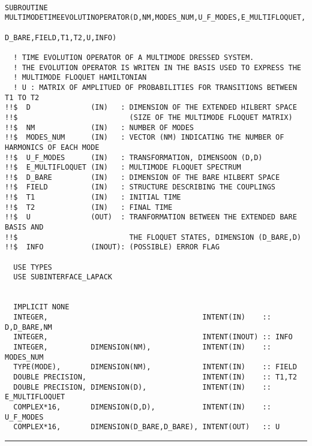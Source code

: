 \documentclass[10pt,a4paper]{article}
\begin{document}
\begin{verbatim}

SUBROUTINE MULTIMODETIMEEVOLUTINOPERATOR(D,NM,MODES_NUM,U_F_MODES,E_MULTIFLOQUET,
                                                D_BARE,FIELD,T1,T2,U,INFO) 

  ! TIME EVOLUTION OPERATOR OF A MULTIMODE DRESSED SYSTEM. 
  ! THE EVOLUTION OPERATOR IS WRITEN IN THE BASIS USED TO EXPRESS THE 
  ! MULTIMODE FLOQUET HAMILTONIAN
  ! U : MATRIX OF AMPLITUED OF PROBABILITIES FOR TRANSITIONS BETWEEN T1 TO T2
!!$  D              (IN)   : DIMENSION OF THE EXTENDED HILBERT SPACE 
!!$                          (SIZE OF THE MULTIMODE FLOQUET MATRIX)
!!$  NM             (IN)   : NUMBER OF MODES            
!!$  MODES_NUM      (IN)   : VECTOR (NM) INDICATING THE NUMBER OF HARMONICS OF EACH MODE
!!$  U_F_MODES      (IN)   : TRANSFORMATION, DIMENSOON (D,D) 
!!$  E_MULTIFLOQUET (IN)   : MULTIMODE FLOQUET SPECTRUM
!!$  D_BARE         (IN)   : DIMENSION OF THE BARE HILBERT SPACE
!!$  FIELD          (IN)   : STRUCTURE DESCRIBING THE COUPLINGS
!!$  T1             (IN)   : INITIAL TIME
!!$  T2             (IN)   : FINAL TIME
!!$  U              (OUT)  : TRANFORMATION BETWEEN THE EXTENDED BARE BASIS AND 
!!$                          THE FLOQUET STATES, DIMENSION (D_BARE,D)
!!$  INFO           (INOUT): (POSSIBLE) ERROR FLAG

  USE TYPES
  USE SUBINTERFACE_LAPACK


  IMPLICIT NONE
  INTEGER,                                    INTENT(IN)    :: D,D_BARE,NM 
  INTEGER,                                    INTENT(INOUT) :: INFO
  INTEGER,          DIMENSION(NM),            INTENT(IN)    :: MODES_NUM
  TYPE(MODE),       DIMENSION(NM),            INTENT(IN)    :: FIELD  
  DOUBLE PRECISION,                           INTENT(IN)    :: T1,T2  
  DOUBLE PRECISION, DIMENSION(D),             INTENT(IN)    :: E_MULTIFLOQUET 
  COMPLEX*16,       DIMENSION(D,D),           INTENT(IN)    :: U_F_MODES   
  COMPLEX*16,       DIMENSION(D_BARE,D_BARE), INTENT(OUT)   :: U           

\end{verbatim}
\begin{center}
\rule{12cm}{1pt}
\end{center}
\end{document}
